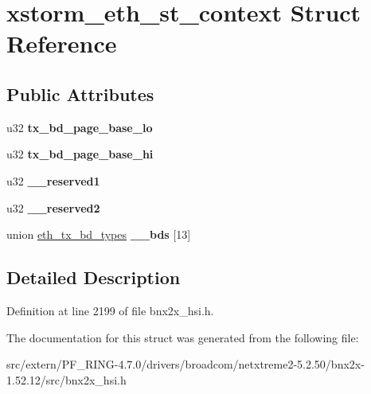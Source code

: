 \hypertarget{structxstorm__eth__st__context}{
\section{xstorm\_\-eth\_\-st\_\-context Struct Reference}
\label{structxstorm__eth__st__context}
}
\subsection*{Public Attributes}
\begin{DoxyCompactItemize}
\item 
\hypertarget{structxstorm__eth__st__context_a7adda82a5aaa24513965cd11729b9afa}{
u32 {\bfseries tx\_\-bd\_\-page\_\-base\_\-lo}}
\label{structxstorm__eth__st__context_a7adda82a5aaa24513965cd11729b9afa}

\item 
\hypertarget{structxstorm__eth__st__context_a05efd3ec138108195d6bd339a62c9167}{
u32 {\bfseries tx\_\-bd\_\-page\_\-base\_\-hi}}
\label{structxstorm__eth__st__context_a05efd3ec138108195d6bd339a62c9167}

\item 
\hypertarget{structxstorm__eth__st__context_a0c895aa85887e8349fcac01f907347df}{
u32 {\bfseries \_\-\_\-reserved1}}
\label{structxstorm__eth__st__context_a0c895aa85887e8349fcac01f907347df}

\item 
\hypertarget{structxstorm__eth__st__context_a2676ffa43019c4f0af355e9fcd874266}{
u32 {\bfseries \_\-\_\-reserved2}}
\label{structxstorm__eth__st__context_a2676ffa43019c4f0af355e9fcd874266}

\item 
\hypertarget{structxstorm__eth__st__context_a1eef3bf2960c9a5f456b07a8ae8c80f9}{
union \hyperlink{unioneth__tx__bd__types}{eth\_\-tx\_\-bd\_\-types} {\bfseries \_\-\_\-bds} \mbox{[}13\mbox{]}}
\label{structxstorm__eth__st__context_a1eef3bf2960c9a5f456b07a8ae8c80f9}

\end{DoxyCompactItemize}


\subsection{Detailed Description}


Definition at line 2199 of file bnx2x\_\-hsi.h.



The documentation for this struct was generated from the following file:\begin{DoxyCompactItemize}
\item 
src/extern/PF\_\-RING-\/4.7.0/drivers/broadcom/netxtreme2-\/5.2.50/bnx2x-\/1.52.12/src/bnx2x\_\-hsi.h\end{DoxyCompactItemize}
